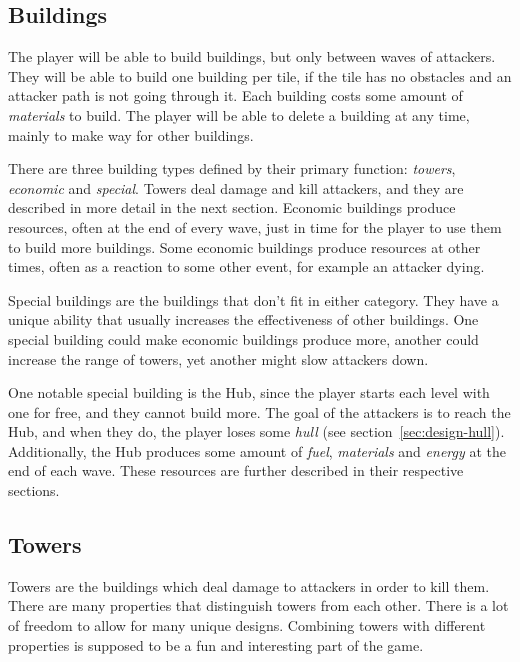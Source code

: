 \subsection{Buildings}\label{sec:design-buildings}

The player will be able to build buildings, but only between waves of attackers.
They will be able to build one building per tile, if the tile has no obstacles and an attacker path is not going through it.
Each building costs some amount of \emph{materials} to build.
The player will be able to delete a building at any time, mainly to make way for other buildings.

There are three building types defined by their primary function: \emph{towers}, \emph{economic} and \emph{special}.
Towers deal damage and kill attackers, and they are described in more detail in the next section.
Economic buildings produce resources, often at the end of every wave, just in time for the player to use them to build more buildings.
Some economic buildings produce resources at other times, often as a reaction to some other event, for example an attacker dying.

Special buildings are the buildings that don't fit in either category.
They have a unique ability that usually increases the effectiveness of other buildings.
One special building could make economic buildings produce more, another could increase the range of towers, yet another might slow attackers down.

One notable special building is the Hub, since the player starts each level with one for free, and they cannot build more.
The goal of the attackers is to reach the Hub, and when they do, the player loses some \emph{hull} (see section~\ref{sec:design-hull}).
Additionally, the Hub produces some amount of \emph{fuel}, \emph{materials} and \emph{energy} at the end of each wave.
These resources are further described in their respective sections.

\subsection{Towers}\label{sec:design-towers}

Towers are the buildings which deal damage to attackers in order to kill them.
There are many properties that distinguish towers from each other.
There is a lot of freedom to allow for many unique designs.
Combining towers with different properties is supposed to be a fun and interesting part of the game.

